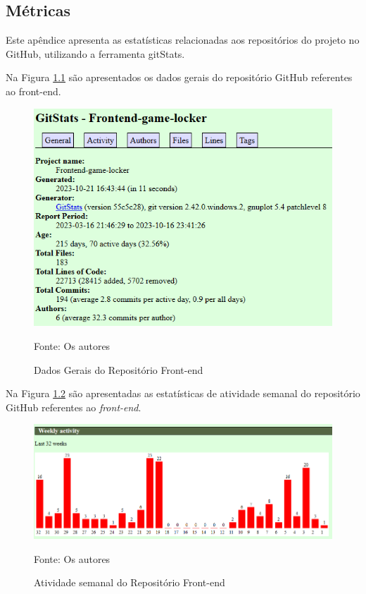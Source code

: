 \begin{apendicesenv}
\chapter{Métricas}
\label{Métricas}

Este apêndice apresenta as estatísticas relacionadas aos repositórios do projeto no GitHub, utilizando a ferramenta gitStats.

Na Figura \ref{generalFrontend} são apresentados os dados gerais do repositório GitHub referentes ao front-end.

\begin{figure}[H]
	\centering
	\includegraphics[scale=0.8]{./imagens/metricas/gitStatsFrontend/gitStatsGeneral.png}
	\caption{Dados Gerais do Repositório Front-end}
	Fonte: Os autores
    \label{generalFrontend}
\end{figure}
\pagebreak

Na Figura \ref{weeklyActivityFrontend} são apresentadas as estatísticas de atividade semanal do repositório GitHub referentes ao \textit{front-end}.

\begin{figure}[H]
	\centering
	\includegraphics[scale=0.7]{./imagens/metricas/gitStatsFrontend/activity/weeklyActivity.png}
	\caption{Atividade semanal do Repositório Front-end}
	Fonte: Os autores
    \label{weeklyActivityFrontend}
\end{figure}


\end{apendicesenv}
